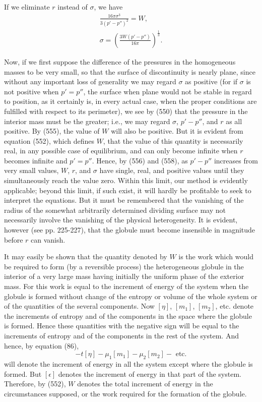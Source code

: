 \documentclass[12pt]{memoir}
\begin{document}
{If we eliminate $r$ instead of $\sigma$, we have
\begin{gather}
\frac{16 \pi \sigma^3}{3(p'-p'')^2} = W,  \label{557} \\
\sigma = \left( \frac{3W(p'-p'')}{16\pi}\right)^{\frac{1}{3}}.  \label{558} \end{gather}

Now, if we first suppose the difference of the pressures in the homogeneous masses to be very small, so that the surface of discontinuity is nearly plane, since without any important loss of generality we may regard $\sigma$ as positive (for if $\sigma$ is not positive when $p'=p''$, the surface when plane would not be stable in regard to position, as it certainly is, in every actual case, when the proper conditions are fulfilled with respect to its perimeter), we see by (550) that the pressure in the interior mass must be the greater; i.e., we may regard $\sigma$, $p'-p''$, and $r$ as all positive. By (555), the value of $W$ will also be positive. But it is evident from equation (552), which defines $W$, that the value of this quantity is necessarily real, in any possible case of equilibrium, and can only become infinite when $r$ becomes infinite and $p'=p''$. Hence, by (556) and (558), as $p'-p''$ increases from very small values, $W$, $r$, and $\sigma$ have single, real, and positive values until they simultaneously reach the value zero. Within this limit, our method is evidently applicable; beyond this limit, if such exist, it will hardly be profitable to seek to interpret the equations. But it must be remembered that the vanishing of the radius of the somewhat arbitrarily determined dividing surface may not necessarily involve the vanishing of the physical heterogeneity. It is evident, however (see pp. 225-227), that the globule must become insensible in magnitude before $r$ can vanish.

It may easily be shown that the quantity denoted by $W$ is the work which would be required to form (by a reversible process) the heterogeneous globule in the interior of a very large mass having initially the uniform phase of the exterior mass. For this work is equal to the increment of energy of the system when the globule is formed without change of the entropy or volume of the whole system or of the quantities of the several components. Now $[\eta]$, $[m_1]$, $[m_2]$, etc. denote the increments of entropy and of the components in the space where the globule is formed. Hence these quantities with the negative sign will be equal to the increments of entropy and of the components in the rest of the system. And hence, by equation (86),
$$ -t[\eta] -\mu_1[m_1] -\mu_2[m_2]-\text{ etc.}$$
will denote the increment of energy in all the system except where the globule is formed. But $[\epsilon]$ denotes the increment of energy in that part of the system. Therefore, by (552), $W$ denotes the total increment of energy in the circumstances supposed, or the work required for the formation of the globule.

}
\end{document}
